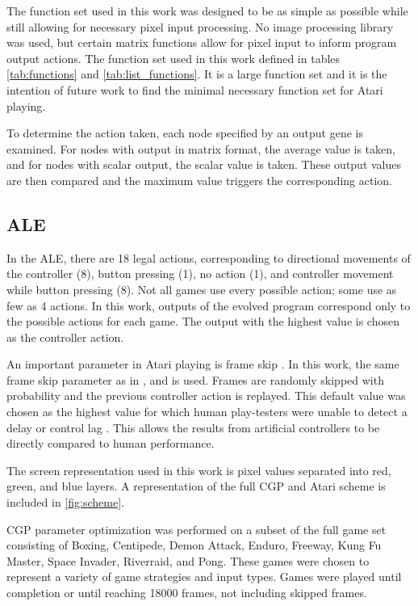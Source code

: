 \documentclass[sigconf,screen]{acmart}\settopmatter{printfolios=true,printacmref=false}
\begin{document}
The function set used in this work was designed to be as simple as possible
while still allowing for necessary pixel input processing. No image processing
library was used, but certain matrix functions allow for pixel input to inform
program output actions. The function set used in this work defined in tables
\autoref{tab:functions} and \autoref{tab:list_functions}. It is a large function
set and it is the intention of future work to find the minimal necessary
function set for Atari playing.

To determine the action taken, each node specified by an output gene is
examined. For nodes with output in matrix format, the average value is taken,
and for nodes with scalar output, the scalar value is taken. These output values
are then compared and the maximum value triggers the corresponding action.

\subsection{ALE}

In the ALE, there are 18 legal actions, corresponding to directional movements
of the controller (8), button pressing (1), no action (1), and controller
movement while button pressing (8). Not all games use every possible action;
some use as few as 4 actions. In this work, outputs of the evolved program
correspond only to the possible actions for each game. The output with the
highest value is chosen as the controller action.

An important parameter in Atari playing is frame skip \cite{braylan2000frame}.
In this work, the same frame skip parameter as in
\citet{hausknecht2014neuroevolution}, \citet{kelly2017emergent} and
\citet{mnih2015human} is used. Frames are randomly skipped with probability
 and the previous controller action is replayed. This default
value was chosen as the highest value for which human play-testers were unable
to detect a delay or control lag \cite{machado17arcade}. This allows the results
from artificial controllers to be directly compared to human performance.

The screen representation used in this work is pixel values separated into red,
green, and blue layers. A representation of the full CGP and Atari scheme is
included in \autoref{fig:scheme}.

CGP parameter optimization was performed on a subset of the full game set
consisting of Boxing, Centipede, Demon Attack, Enduro, Freeway, Kung Fu Master,
Space Invader, Riverraid, and Pong. These games were chosen to represent a
variety of game strategies and input types. Games were played until completion
or until reaching 18000 frames, not including skipped frames.
\end{document}
